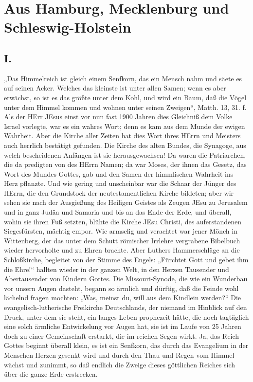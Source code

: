 \chapter[Aus Hamburg, Mecklenburg und …]{Aus Hamburg, Mecklenburg und Schleswig-Holstein}

\section{I.}

„Das Himmelreich ist gleich einem Senfkorn, das ein Mensch nahm und säete es auf seinen Acker. Welches das kleinste ist unter allen Samen; wenn es aber erwächst, so ist es das größte unter dem Kohl, und wird ein Baum, daß die Vögel unter dem Himmel kommen und wohnen unter seinen Zweigen“, Matth. 13, 31. f. Als der HErr JEsus einst vor nun fast 1900 Jahren dies Gleichniß dem Volke Israel vorlegte, war es ein wahres Wort; denn es kam aus dem Munde der ewigen Wahrheit. Aber die Kirche aller Zeiten hat dies Wort ihres HErrn und Meisters auch herrlich bestätigt gefunden. Die Kirche des alten Bundes, die Synagoge, aus welch bescheidenen Anfängen ist sie herausgewachsen! Da waren die Patriarchen, die da predigten von des HErrn Namen; da war Moses, der ihnen das Gesetz, das Wort des Mundes Gottes, gab und den Samen der himmlischen Wahrheit ins Herz pflanzte. Und wie gering und unscheinbar war die Schaar der Jünger des HErrn, die den Grundstock der neutestamentlichen Kirche bildeten; aber wir sehen sie nach der Ausgießung des Heiligen Geistes als Zeugen JEsu zu Jerusalem und in ganz Judäa und Samaria und bis an das Ende der Erde, und überall, wohin sie ihren Fuß setzten, blühte die Kirche JEsu Christi, des auferstandenen Siegesfürsten, mächtig empor. Wie armselig und verachtet war jener Mönch in Wittenberg, der das unter dem Schutt römischer Irrlehre vergrabene Bibelbuch wieder hervorholte und zu Ehren brachte. Aber Luthers Hammerschläge an die Schloßkirche, begleitet von der Stimme des Engels: „Fürchtet Gott und gebet ihm die Ehre!“ hallten wieder in der ganzen Welt, in den Herzen Tausender und Abertausender von Kindern Gottes. Die Missouri-Synode, die wie ein Wunderbau vor unsern Augen dasteht, begann so ärmlich und dürftig, daß die Feinde wohl lächelnd fragen mochten: „Was, meinst du, will aus dem Kindlein werden?“ Die evangelisch-lutherische Freikirche Deutschlands, der niemand im Hinblick auf
den Druck, unter dem sie steht, ein langes Leben prophezeit hätte, die noch tagtäglich eine solch ärmliche Entwickelung vor Augen hat, sie ist im Laufe von 25 Jahren doch zu einer Gemeinschaft erstarkt, die im reichen Segen wirkt. Ja, das Reich Gottes beginnt überall klein, es ist ein Senfkorn, das durch das Evangelium in der Menschen Herzen gesenkt wird und durch den Thau und Regen vom Himmel wächst und zunimmt, so daß endlich die Zweige dieses göttlichen Reiches sich über die ganze Erde erstrecken.

